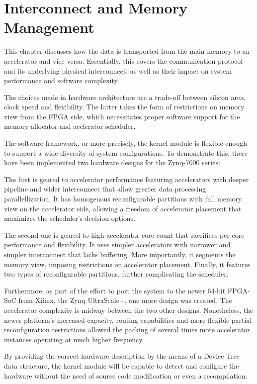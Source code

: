 \chapter{Interconnect and Memory Management}
\label{chap:interconnect}

This chapter discusses how the data is transported 
from the main memory to an accelerator and vice versa. 
Essentially, this covers the communication protocol 
and its underlying physical interconnect, 
as well as their impact on system performance 
and software complexity.

The choices made in hardware architecture are 
a trade-off between silicon area, clock speed and flexibility. 
The latter takes the form of restrictions on memory view from the FPGA side, 
which necessitates proper software support 
for the memory allocator and acclerator scheduler.

The software framework, or more precisely, the kernel module
is flexible enough to support a wide diversity of system configurations. 
To demonstrate this, there have been implemented two hardware designs
for the Zynq-7000 series:

The first is geared to accelerator performance featuring
accelerators with deeper pipeline and wider interconnect that allow
greater data processing parallellization.
It has homogenous reconfigurable partitions with
full memory view on the accelerator side, 
allowing a freedom of accelerator placement that
maximizes the scheduler's decision options.

The second one is geared to high accelerator core count 
that sacrifices per-core performance and flexibility.
It uses simpler accelerators with 
narrower and simpler interconnect that lacks buffering.
More importantly, it segments the memory view, 
imposing restrictions on accelerator placement. 
Finally, it features two types of reconfigurable partitions,
further complicating the scheduler.

Furthermore, as part of the effort to port the system
to the newer 64-bit FPGA-SoC from Xilinx, the Zynq UltraScale+,
one more design was created. The accelerator complexity is midway
between the two other designs. Nonetheless, the newer platform's
increased capacity, routing capabilities and 
more flexible partial reconfiguration restrictions
allowed the packing of several times more accelerator instances
operating at much higher frequency.

By providing the correct hardware description 
by the means of a Device Tree\cite{devicetree} data structure, 
the kernel module will be capable to detect and configure the hardware
without the need of source code modification or even a recompilation.

